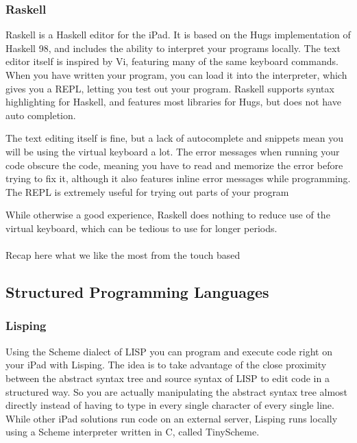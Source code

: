 \subsubsection{Raskell}

Raskell is a Haskell editor for the iPad. It is based on the Hugs implementation of Haskell 98, and includes the ability to interpret your programs locally. The text editor itself is inspired by Vi, featuring many of the same keyboard commands. When you have written your program, you can load it into the interpreter, which gives you a REPL, letting you test out your program. Raskell supports syntax highlighting for Haskell, and features most libraries for Hugs, but does not have auto completion.

The text editing itself is fine, but a lack of autocomplete and snippets mean you will be using the virtual keyboard a lot. The error messages when running your code obscure the code, meaning you have to read and memorize the error before trying to fix it, although it also features inline error messages while programming. The REPL is extremely useful for trying out parts of your program 

While otherwise a good experience, Raskell does nothing to reduce use of the virtual keyboard, which can be tedious to use for longer periods.

\paragraph{}

Recap here what we like the most from the touch based


\subsection{Structured Programming Languages}



\subsubsection{Lisping}

Using the Scheme dialect of LISP you can program and execute code right on your iPad with Lisping. The idea is to take advantage of the close proximity between the abstract syntax tree and source syntax of LISP to edit code in a structured way. So you are actually manipulating the abstract syntax tree almost directly instead of having to type in every single character of every single line. While other iPad solutions run code on an external server, Lisping runs locally using a Scheme interpreter written in C, called TinyScheme.

